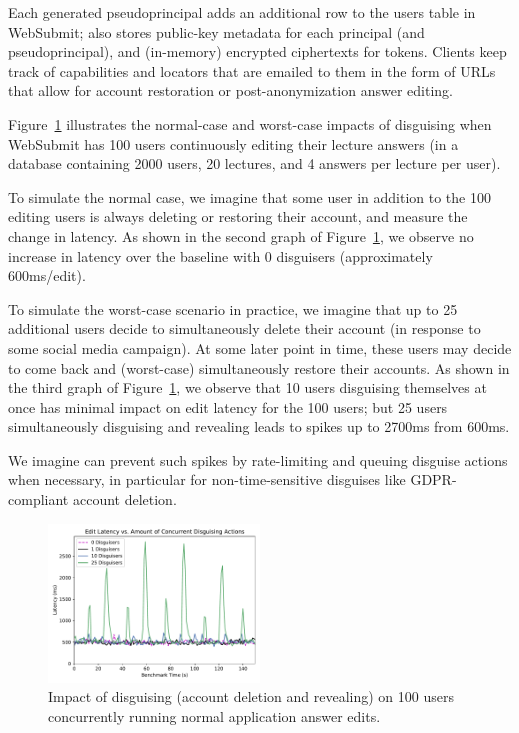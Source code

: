 Each generated pseudoprincipal adds an additional row to the users table in WebSubmit; \sys also stores public-key metadata for each principal (and
pseudoprincipal), and (in-memory) encrypted ciphertexts for tokens.
Clients keep track of capabilities and locators that are emailed to them in the form of URLs that
allow for account restoration or post-anonymization answer editing.

Figure~\ref{fig:concurrent} illustrates the normal-case and worst-case impacts of disguising when
WebSubmit has 100 users continuously editing their lecture answers (in a database containing 2000
users, 20 lectures, and 4 answers per lecture per user).

To simulate the normal case, we imagine that some user in addition to the 100 editing users is
always deleting or restoring their account, and measure the change in latency. As shown in
the second graph of Figure~\ref{fig:concurrent}, we observe no
increase in latency over the baseline with 0 disguisers (approximately 600ms/edit).

To simulate the worst-case scenario in practice, we imagine that up to 25 additional users decide to
simultaneously delete their account (\eg in response to some social media campaign). At some later
point in time, these users may decide to come back and (worst-case) simultaneously restore their
accounts. As shown in
the third graph of Figure~\ref{fig:concurrent}, we observe that 10 users disguising themselves at once has
minimal impact on edit latency for the 100 users; but 25 users simultaneously disguising and
revealing leads to spikes up to 2700ms from 600ms.

We imagine \sys can prevent such spikes by rate-limiting and queuing disguise actions when
necessary, in particular for non-time-sensitive disguises like GDPR-compliant account deletion.

\begin{figure}[t!]
    \centering
        \includegraphics[width=0.5\textwidth]{figs/concurrent_results_20lec_100users}
    \caption{Impact of disguising (account deletion and revealing) on 100 users concurrently running
    normal application answer edits.} 
    \label{fig:concurrent}
\end{figure}


